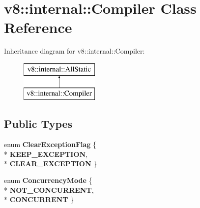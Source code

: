\hypertarget{classv8_1_1internal_1_1_compiler}{}\section{v8\+:\+:internal\+:\+:Compiler Class Reference}
\label{classv8_1_1internal_1_1_compiler}
Inheritance diagram for v8\+:\+:internal\+:\+:Compiler\+:\begin{figure}[H]
\begin{center}
\leavevmode
\includegraphics[height=2.000000cm]{classv8_1_1internal_1_1_compiler}
\end{center}
\end{figure}
\subsection*{Public Types}
\begin{DoxyCompactItemize}
\item 
enum {\bfseries Clear\+Exception\+Flag} \{ \\*
{\bfseries K\+E\+E\+P\+\_\+\+E\+X\+C\+E\+P\+T\+I\+ON}, 
\\*
{\bfseries C\+L\+E\+A\+R\+\_\+\+E\+X\+C\+E\+P\+T\+I\+ON}
 \}\hypertarget{classv8_1_1internal_1_1_compiler_ab59ab49f4051abae5d94e22871913b96}{}\label{classv8_1_1internal_1_1_compiler_ab59ab49f4051abae5d94e22871913b96}

\item 
enum {\bfseries Concurrency\+Mode} \{ \\*
{\bfseries N\+O\+T\+\_\+\+C\+O\+N\+C\+U\+R\+R\+E\+NT}, 
\\*
{\bfseries C\+O\+N\+C\+U\+R\+R\+E\+NT}
 \}\hypertarget{classv8_1_1internal_1_1_compiler_a72baa3ba6b839cadb501c8bdf76ad7b8}{}\label{classv8_1_1internal_1_1_compiler_a72baa3ba6b839cadb501c8bdf76ad7b8}

\end{DoxyCompactItemize}
